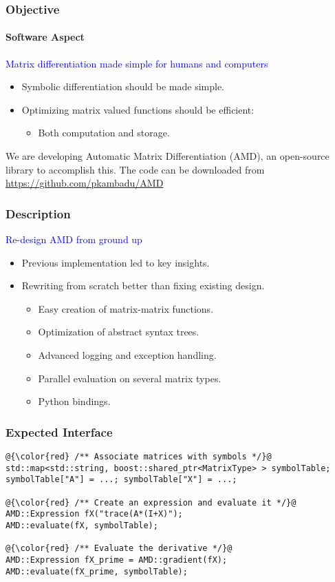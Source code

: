 \begin{frame}
\frametitle{Objective}
\framesubtitle{Software Aspect}
%
\begin{center}
\textcolor{blue}{Matrix differentiation made simple for humans and computers}
\end{center}
%
\begin{itemize}
\item Symbolic differentiation should be made simple.
\item Optimizing matrix valued functions should be efficient:
  \begin{itemize}
  \item Both computation and storage.
  \end{itemize}
\end{itemize}

%
\begin{center}
We are developing Automatic Matrix Differentiation (AMD), an open-source \Cpp{}
library to accomplish this.  The code can be downloaded from
\textcolor{blue}{\url{https://github.com/pkambadu/AMD}}
\end{center}
\end{frame}

\begin{frame}
\frametitle{Description}
\begin{center}
\textcolor{blue}{Re-design AMD from ground up}
\end{center}

\begin{itemize}
\item Previous implementation led to key insights.
\item Rewriting from scratch better than fixing existing design.
    \begin{itemize}
    \item Easy creation of matrix-matrix functions.
    \item Optimization of abstract syntax trees.
    \item Advanced logging and exception handling.
    \item Parallel evaluation on several matrix types.
    \item Python bindings.
    \end{itemize}
\end{itemize}
\end{frame}

\begin{frame}[fragile]
\frametitle{Expected \Cpp{} Interface}

\begin{lstlisting}[style=basic]
@{\color{red} /** Associate matrices with symbols */}@
std::map<std::string, boost::shared_ptr<MatrixType> > symbolTable;
symbolTable["A"] = ...; symbolTable["X"] = ...;

@{\color{red} /** Create an expression and evaluate it */}@
AMD::Expression fX("trace(A*(I+X)");
AMD::evaluate(fX, symbolTable);

@{\color{red} /** Evaluate the derivative */}@
AMD::Expression fX_prime = AMD::gradient(fX);
AMD::evaluate(fX_prime, symbolTable);
\end{lstlisting}
\end{frame}

